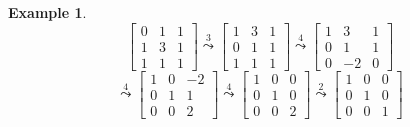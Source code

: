 \documentclass[a4paper,landscape,twocolumn]{article}
\newtheorem{ex}{Example}[section]
\begin{document}
\begin{ex}
  \label{bsp-6.25}
  \[
    \begin{bmatrix}
      0 & 1 & 1 \\
      1 & 3 & 1 \\
      1 & 1 & 1
    \end{bmatrix}
    \overset{3}{\leadsto}
    \begin{bmatrix}
      1 & 3 & 1 \\
      0 & 1 & 1 \\
      1 & 1 & 1
    \end{bmatrix}
    \overset{4}{\leadsto}
    \begin{bmatrix}
      1 & 3 & 1 \\
      0 & 1 & 1 \\
      0 & -2 & 0
    \end{bmatrix}
  \] \[
    \overset{4}{\leadsto}
    \begin{bmatrix}
      1 & 0 & -2 \\
      0 & 1 & 1 \\
      0 & 0 & 2
    \end{bmatrix}
    \overset{4}{\leadsto}
    \begin{bmatrix}
      1 & 0 & 0 \\
      0 & 1 & 0 \\
      0 & 0 & 2
    \end{bmatrix}
    \overset{2}{\leadsto}
    \begin{bmatrix}
      1 & 0 & 0 \\
      0 & 1 & 0 \\
      0 & 0 & 1
    \end{bmatrix}
  \]
\end{ex}
\end{document}
